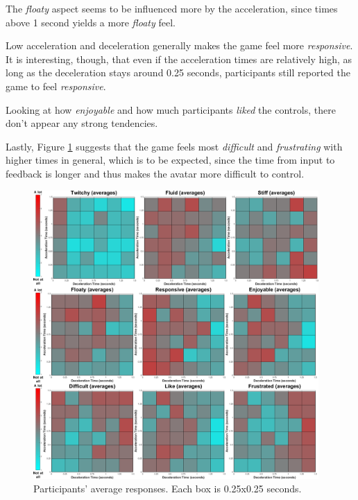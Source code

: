 The \textit{floaty} aspect seems to be influenced more by the acceleration, since times above 1 second yields a more \textit{floaty} feel.

Low acceleration and deceleration generally makes the game feel more \textit{responsive}. It is interesting, though, that even if the acceleration times are relatively high, as long as the deceleration stays around 0.25 seconds, participants still reported the game to feel \textit{responsive}.

Looking at how \textit{enjoyable} and how much participants \textit{liked} the controls, there don't appear any strong tendencies.

Lastly, Figure \ref{fig:all_classes} suggests that the game feels most \textit{difficult} and \textit{frustrating} with higher times in general, which is to be expected, since the time from input to feedback is longer and thus makes the avatar more difficult to control.

\begin{figure}[!htb]
\centering
\includegraphics[width=0.97\textwidth]{Pics/Classes/averages/all_together}
\caption{Participants' average responses. Each box is 0.25x0.25 seconds.}
\label{fig:all_classes}
\end{figure}


